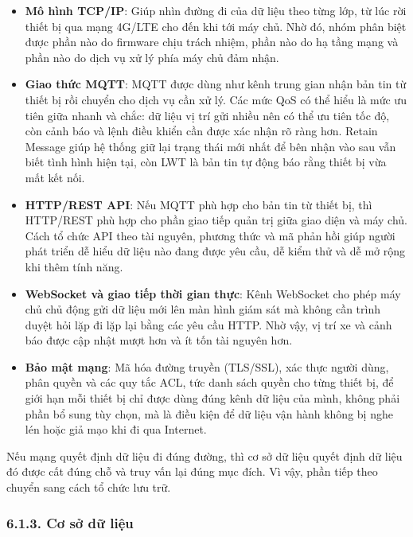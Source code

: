 \documentclass[a4paper]{extarticle}
\providecommand{\tightlist}{%
  \setlength{\itemsep}{0pt}\setlength{\parskip}{0pt}}
\begin{document}
\begin{itemize}
\tightlist
\item
  \textbf{Mô hình TCP/IP}: Giúp nhìn đường đi của dữ liệu theo từng lớp,
  từ lúc rời thiết bị qua mạng 4G/LTE cho đến khi tới máy chủ. Nhờ đó,
  nhóm phân biệt được phần nào do firmware chịu trách nhiệm, phần nào do
  hạ tầng mạng và phần nào do dịch vụ xử lý phía máy chủ đảm nhận.
\item
  \textbf{Giao thức MQTT}: MQTT được dùng như kênh trung gian nhận bản
  tin từ thiết bị rồi chuyển cho dịch vụ cần xử lý. Các mức QoS có thể hiểu là
  mức ưu tiên giữa nhanh và chắc: dữ liệu vị trí gửi nhiều nên có thể
  ưu tiên tốc độ, còn cảnh báo và lệnh điều khiển cần được xác nhận rõ
  ràng hơn. Retain Message giúp hệ thống giữ lại trạng thái mới nhất để
  bên nhận vào sau vẫn biết tình hình hiện tại, còn LWT là bản tin tự
  động báo rằng thiết bị vừa mất kết nối.
\item
  \textbf{HTTP/REST API}: Nếu MQTT phù hợp cho bản tin từ thiết bị, thì
  HTTP/REST phù hợp cho phần giao tiếp quản trị giữa giao diện và máy
  chủ. Cách tổ chức API theo tài nguyên, phương thức và mã phản hồi giúp
  người phát triển dễ hiểu dữ liệu nào đang được yêu cầu, dễ kiểm thử và
  dễ mở rộng khi thêm tính năng.
\item
  \textbf{WebSocket và giao tiếp thời gian thực}: Kênh WebSocket cho
  phép máy chủ chủ động gửi dữ liệu mới lên màn hình giám sát mà không
  cần trình duyệt hỏi lặp đi lặp lại bằng các yêu cầu HTTP. Nhờ vậy, vị trí xe và cảnh
  báo được cập nhật mượt hơn và ít tốn tài nguyên hơn.
\item
  \textbf{Bảo mật mạng}: Mã hóa đường truyền (TLS/SSL), xác thực người
  dùng, phân quyền và các quy tắc ACL, tức danh sách quyền cho từng thiết
  bị, để giới hạn mỗi thiết bị chỉ được dùng đúng kênh dữ liệu của mình,
  không phải phần bổ sung tùy chọn, mà
  là điều kiện để dữ liệu vận hành không bị nghe lén hoặc giả mạo khi đi qua Internet.
\end{itemize}

Nếu mạng quyết định dữ liệu đi đúng đường, thì cơ sở dữ liệu quyết định
dữ liệu đó được cất đúng chỗ và truy vấn lại đúng mục đích. Vì vậy,
phần tiếp theo chuyển sang cách tổ chức lưu trữ.

\subsubsection{6.1.3. Cơ sở dữ
liệu}\label{613-cux1a1-sux1edf-dux1eef-liux1ec7u}
\end{document}
